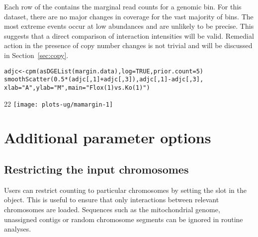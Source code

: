 \documentclass{report}\usepackage[]{graphicx}\usepackage[usenames,dvipsnames]{color}
\makeatletter
\def\maxwidth{ %
  \ifdim\Gin@nat@width>\linewidth
    \linewidth
  \else
    \Gin@nat@width
  \fi
}
\newcommand{\hlnum}[1]{\textcolor[rgb]{0.816,0.125,0.439}{#1}}%
\newcommand{\hlstr}[1]{\textcolor[rgb]{0.251,0.627,0.251}{#1}}%
\newcommand{\hlopt}[1]{\textcolor[rgb]{0,0,0}{#1}}%
\newcommand{\hlstd}[1]{\textcolor[rgb]{0.251,0.251,0.251}{#1}}%
\newcommand{\hlkwb}[1]{\textcolor[rgb]{0,0,0}{#1}}%
\newcommand{\hlkwc}[1]{\textcolor[rgb]{0.251,0.251,0.251}{#1}}%
\newcommand{\hlkwd}[1]{\textcolor[rgb]{0.878,0.439,0.125}{#1}}%
\newenvironment{knitrout}{}{} %
\makeatother
\begin{document}
Each row of the  contains the marginal read counts for a genomic bin.
For this dataset, there are no major changes in coverage for the vast majority of bins.
The most extreme events occur at low abundances and are unlikely to be precise. 
This suggests that a direct comparison of interaction intensities will be valid.
Remedial action in the presence of copy number changes is not trivial and will be discussed in Section~\ref{sec:copy}.

\begin{knitrout}
\color{fgcolor}\begin{kframe}
\begin{alltt}
\hlstd{adjc} \hlkwb{<-} \hlkwd{cpm}\hlstd{(}\hlkwd{asDGEList}\hlstd{(margin.data),} \hlkwc{log}\hlstd{=}\hlnum{TRUE}\hlstd{,} \hlkwc{prior.count}\hlstd{=}\hlnum{5}\hlstd{)}
\hlkwd{smoothScatter}\hlstd{(}\hlnum{0.5}\hlopt{*}\hlstd{(adjc[,}\hlnum{1}\hlstd{]}\hlopt{+}\hlstd{adjc[,}\hlnum{3}\hlstd{]), adjc[,}\hlnum{1}\hlstd{]}\hlopt{-}\hlstd{adjc[,}\hlnum{3}\hlstd{],}
    \hlkwc{xlab}\hlstd{=}\hlstr{"A"}\hlstd{,} \hlkwc{ylab}\hlstd{=}\hlstr{"M"}\hlstd{,} \hlkwc{main}\hlstd{=}\hlstr{"Flox (1) vs. Ko (1)"}\hlstd{)}
\end{alltt}
\end{kframe}\begin{adjustwidth}{2\fltoffset}{2\fltoffset}
\texttt{[image: plots-ug/mamargin-1]} \end{adjustwidth}
\end{knitrout}

\section{Additional parameter options}

\subsection{Restricting the input chromosomes}
\label{sec:restrictchr}

Users can restrict counting to particular chromosomes by setting the  slot in the  object.
This is useful to ensure that only interactions between relevant chromosomes are loaded.
Sequences such as the mitochondrial genome, unassigned contigs or random chromosome segments can be ignored in routine analyses.
\end{document}
